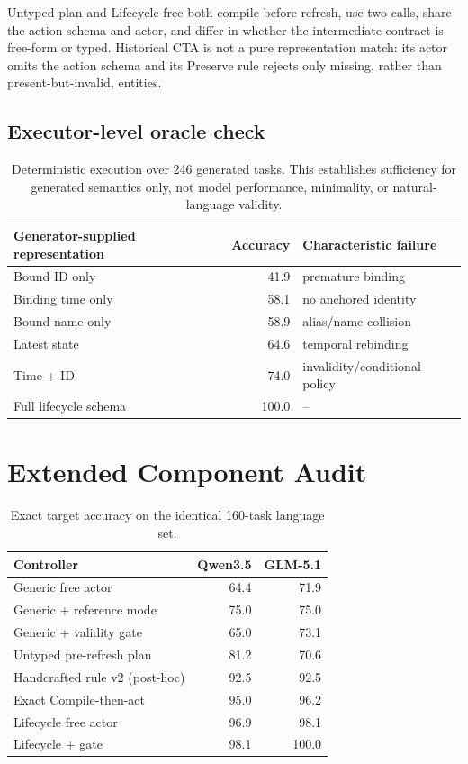 \documentclass[10pt]{article}
\begin{document}
Untyped-plan and Lifecycle-free both compile before refresh, use two calls, share the action
schema and actor, and differ in whether the intermediate contract is free-form or typed.
Historical CTA is not a pure representation match: its actor omits the action schema and its
Preserve rule rejects only missing, rather than present-but-invalid, entities.

\subsection{Executor-level oracle check}
\begin{table}[h]
\centering
\small
\begin{tabular}{lrl}
\toprule
Generator-supplied representation & Accuracy & Characteristic failure\\
\midrule
Bound ID only & 41.9 & premature binding\\
Binding time only & 58.1 & no anchored identity\\
Bound name only & 58.9 & alias/name collision\\
Latest state & 64.6 & temporal rebinding\\
Time + ID & 74.0 & invalidity/conditional policy\\
Full lifecycle schema & 100.0 & --\\
\bottomrule
\end{tabular}
\caption{Deterministic execution over 246 generated tasks. This establishes sufficiency for
generated semantics only, not model performance, minimality, or natural-language validity.}
\end{table}

\section{Extended Component Audit}
\begin{table}[h]
\centering
\small
\begin{tabular}{lrr}
\toprule
Controller & Qwen3.5 & GLM-5.1\\
\midrule
Generic free actor & 64.4 & 71.9\\
Generic + reference mode & 75.0 & 75.0\\
Generic + validity gate & 65.0 & 73.1\\
Untyped pre-refresh plan & 81.2 & 70.6\\
Handcrafted rule v2 (post-hoc) & 92.5 & 92.5\\
Exact Compile-then-act & 95.0 & 96.2\\
Lifecycle free actor & 96.9 & 98.1\\
Lifecycle + gate & 98.1 & 100.0\\
\bottomrule
\end{tabular}
\caption{Exact target accuracy on the identical 160-task language set.}
\end{table}
\end{document}
